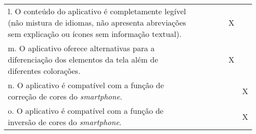 \documentclass[portuguese,oneside]{tcc}
\begin{document}
\begin{center}
\begin{longtabu}{|L{25em}|c|c|c|c|c|c|}
																							l. O conteúdo do aplicativo é completamente legível (não mistura de idiomas, não apresenta abreviações sem explicação ou ícones sem informação textual). & & & & & X & \\ 
																							m. O aplicativo oferece alternativas para a diferenciação dos elementos da tela além de diferentes colorações. & & & & & X & \\ 
																							n. O aplicativo é compatível com a função de correção de cores do \emph{smartphone}. & & & & & & X \\ 
																							o. O aplicativo é compatível com a função de inversão de cores do \emph{smartphone}. & & & & & & X \\ 
																						\end{longtabu}
																					\end{center}
																					
\end{document}
